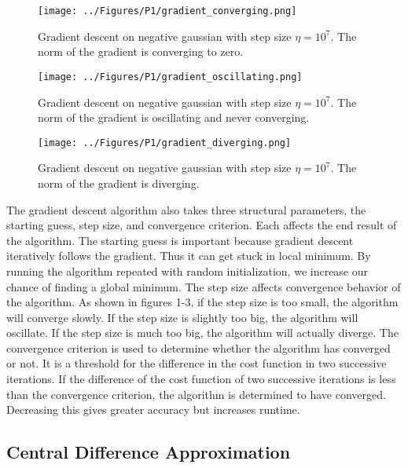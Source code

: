 \documentclass[a4paper,twoside]{article}
\begin{document}
\begin{figure}[h]
  \texttt{[image: ../Figures/P1/gradient\_converging.png]}
  \caption{Gradient descent on negative gaussian with step size $\eta = 10^7$. The norm of the gradient is converging to zero.}
  \label{fig:gradient_converging}
\end{figure}

\begin{figure}[h]
  \texttt{[image: ../Figures/P1/gradient\_oscillating.png]}
  \caption{Gradient descent on negative gaussian with step size $\eta = 10^7$. The norm of the gradient is oscillating and never converging.}
  \label{fig:gradient_oscillating}
\end{figure}

\begin{figure}[h]
  \texttt{[image: ../Figures/P1/gradient\_diverging.png]}
  \caption{Gradient descent on negative gaussian with step size $\eta = 10^7$. The norm of the gradient is diverging.}
  \label{fig:gradient_converging}
\end{figure}

The gradient descent algorithm also takes three structural parameters, the starting guess, step size, and convergence criterion. Each affects the end result of the algorithm. The starting guess is important because gradient descent iteratively follows the gradient. Thus it can get stuck in local minimum. By running the algorithm repeated with random initialization, we increase our chance of finding a global minimum. The step size affects convergence behavior of the algorithm. As shown in figures 1-3, if the step size is too small, the algorithm will converge slowly. If the step size is slightly too big, the algorithm will oscillate. If the step size is much too big, the algorithm will actually diverge. The convergence criterion is used to determine whether the algorithm has converged or not. It is a threshold for the difference in the cost function in two successive iterations. If the difference of the cost function of two successive iterations is less than the convergence criterion, the algorithm is determined to have converged. Decreasing this gives greater accuracy but increases runtime.

\subsection{Central Difference Approximation}
\end{document}
